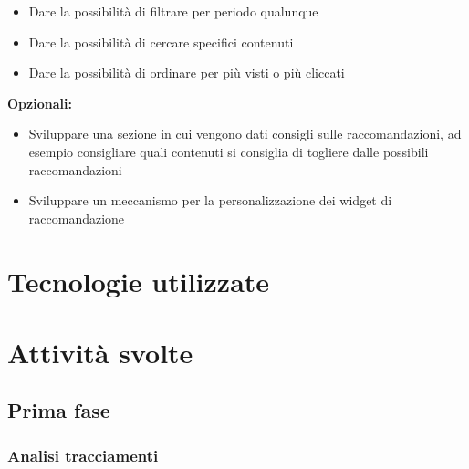 \documentclass[a4paper, 12pt, twoside, openright]{book}
\begin{document}
\begin{itemize}
	\item Dare la possibilità di filtrare per periodo qualunque
	\item Dare la possibilità di cercare specifici contenuti
	\item Dare la possibilità di ordinare per più visti o più cliccati
\end{itemize}
\textbf{Opzionali:}
\begin{itemize}
	\item Sviluppare una sezione in cui vengono dati consigli sulle raccomandazioni, ad esempio consigliare quali contenuti si consiglia di togliere dalle possibili raccomandazioni
	\item Sviluppare un meccanismo per la personalizzazione dei widget di raccomandazione
\end{itemize}

\section{Tecnologie utilizzate}

\section{Attività svolte}

\subsection{Prima fase}

\subsubsection{Analisi tracciamenti}
\end{document}
